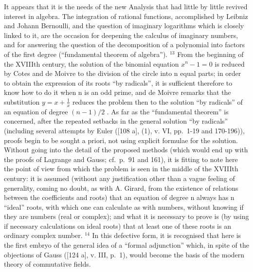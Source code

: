 It appears that it is the needs of the new Analysis that had little by little revived interest in algebra. The integration of rational functions, accomplished by Leibniz and Johann Bernoulli, and the question of imaginary logarithms which is closely linked to it, are the occasion for deepening the calculus of imaginary numbers, and for answering the question of the decomposition of a polynomial into factors of the first degree (``fundamental theorem of algebra''). \(^{13}\) From the beginning of the XVIIIth century, the solution of the binomial equation \(x^{n}-1=0\) is reduced by Cotes and de Moivre to the division of the circle into n equal parts; in order to obtain the expression of its roots ``by radicals'', it is sufficient therefore to know how to do it when n is an odd prime, and de Moivre remarks that the substitution \(y = x + \frac{1}{x}\) reduces the problem then to the solution ``by radicals'' of an equation of degree \((n - 1)/2\) . As far as the ``fundamental theorem'' is concerned, after the repeated setbacks in the general solution ``by radicals'' (including several attempts by Euler ({[}108 a{]}, (1), v. VI, pp.~1-19 and 170-196)), proofs begin to be sought a priori, not using explicit formulae for the solution. Without going into the detail of the proposed methods (which would end up with the proofs of Lagrange and Gauss; cf.~p.~91 and 161), it is fitting to note here the point of view from which the problem is seen in the middle of the XVIIIth century: it is assumed (without any justification other than a vague feeling of generality, coming no doubt, as with A. Girard, from the existence of relations between the coefficients and roots) that an equation of degree n always has n ``ideal'' roots, with which one can calculate as with numbers, without knowing if they are numbers (real or complex); and what it is necessary to prove is (by using if necessary calculations on ideal roots) that at least one of these roots is an ordinary complex number. \(^{14}\) In this defective form, it is recognised that here is the first embryo of the general idea of a ``formal adjunction'' which, in spite of the objections of Gauss ({[}124 a{]}, v. III, p.~1), would become the basis of the modern theory of commutative fields.

